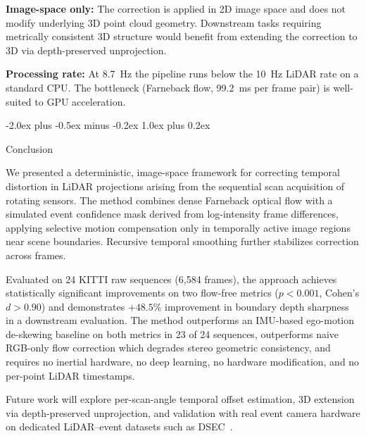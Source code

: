 \documentclass[conference]{IEEEtran}
\makeatletter
\def\section{\@startsection{section}{1}{\z@}
  {-2.0ex plus -0.5ex minus -0.2ex}
  {1.0ex plus 0.2ex}
  {\normalfont\large\bfseries\raggedright}}
\makeatother
\begin{document}
\textbf{Image-space only:} The correction is applied in 2D
image space and does not modify underlying 3D point cloud
geometry. Downstream tasks requiring metrically consistent 3D
structure would benefit from extending the correction to 3D
via depth-preserved unprojection.

\textbf{Processing rate:} At 8.7~Hz the pipeline runs below
the 10~Hz LiDAR rate on a standard CPU. The bottleneck
(Farneback flow, 99.2~ms per frame pair) is well-suited to GPU
acceleration.

\section{Conclusion}

We presented a deterministic, image-space framework for
correcting temporal distortion in LiDAR projections arising
from the sequential scan acquisition of rotating sensors.
The method combines dense Farneback optical flow with a
simulated event confidence mask derived from log-intensity
frame differences, applying selective motion compensation
only in temporally active image regions near scene boundaries.
Recursive temporal smoothing further stabilizes correction
across frames.

Evaluated on 24 KITTI raw sequences (6{,}584 frames), the
approach achieves statistically significant improvements on
two flow-free metrics ($p{<}0.001$, Cohen's
$d{>}0.90$) and demonstrates $+48.5\%$ improvement in
boundary depth sharpness in a downstream evaluation.
The method outperforms an IMU-based ego-motion de-skewing
baseline on both metrics in 23 of 24 sequences,
outperforms naive RGB-only flow correction which degrades
stereo geometric consistency, and requires no inertial
hardware, no deep learning, no hardware modification, and no
per-point LiDAR timestamps.

Future work will explore per-scan-angle temporal offset
estimation, 3D extension via depth-preserved unprojection,
and validation with real event camera hardware on dedicated
LiDAR--event datasets such as DSEC~\cite{bartolomei2024}.
\end{document}
